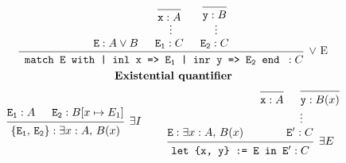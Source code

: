 \documentclass[convert={density=500}, border=2pt, varwidth=8in]{standalone}
\begin{document}
\begin{spreadlines}{2em}
\begin{gather*}
\begin{prooftree}
    \hypo{\mathtt{E} : A \vee B}
    \infer0{\mathtt{x} : A} \ellipsis{}{\mathtt{E_1} : C}
    \infer0{\mathtt{y} : B} \ellipsis{}{\mathtt{E_2} : C}
    \infer3[$\vee$ E]{
        \texttt{
            match E with
            | inl x => $\mathtt{E_1}$
            | inr y => $\mathtt{E_2}$
            end
        } : C
    }
\end{prooftree}
\\ \textbf{Existential quantifier} \\
\begin{prooftree}
    \hypo{\mathtt{E_1} : A}
    \hypo{\mathtt{E_2} : B[x \mapsto E_1]}
    \infer2[$\exists I$]{\mathtt{\{E_1, \, E_2\}} : \exists x : A, \, B(x)}
\end{prooftree}
~ \qquad
\begin{prooftree}
    \hypo{\mathtt{E} : \exists x : A, \, B(x)}
    \infer0{\mathtt{x} : A}
    \infer0{\mathtt{y} : B(x)}
    \infer[no rule]2{}
    \ellipsis{}{\mathtt{E'} : C}
    \infer2[$\exists E$]{\texttt{let \{x, y\} := E in $\mathtt{E'}$} : C}
\end{prooftree}
\end{gather*}
\end{spreadlines}
\end{document}
